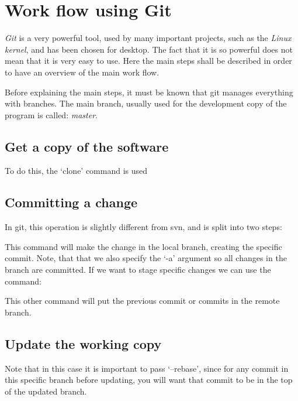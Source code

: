 \chapter{Work flow using Git}

\emph{Git} is a very powerful tool, used by many important projects, such as the \emph{Linux kernel}, and has been chosen for \GNOME desktop. The fact that it is so powerful does not mean that it is very easy to use. Here the main steps shall be described in order to have an overview of the main work flow.

Before explaining the main steps, it must be known that git manages everything with branches. The main branch, usually used for the development copy of the program is called: \emph{master}.

\section*{Get a copy of the software}

To do this, the  `clone' command is used 


\noindent{}

\section*{Committing a change}

In git, this operation is slightly different from svn, and is split into two steps:

\noindent{}

This command will make the change in the local branch, creating the specific commit. Note, that that we also specify the `-a' argument so all changes in the branch are committed. If we want to stage specific changes we can use the command:

\noindent{}

\noindent{}

This other command will put the previous commit or commits in the remote branch.

\section*{Update the working copy}

\noindent{}

Note that in this case it is important to pass `--rebase', since for any commit in this specific branch before updating, 
you will want that commit to be in the top of the updated branch.


